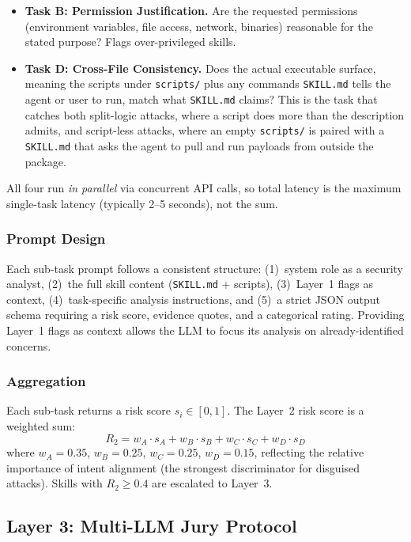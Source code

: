 \documentclass[sigconf,nonacm]{acmart}
\begin{document}
\begin{itemize}
    \item \textbf{Task B: Permission Justification.} Are the requested permissions (environment variables, file access, network, binaries) reasonable for the stated purpose? Flags over-privileged skills.

    \item \textbf{Task D: Cross-File Consistency.} Does the actual executable surface, meaning the scripts under \texttt{scripts/} plus any commands \texttt{SKILL.md} tells the agent or user to run, match what \texttt{SKILL.md} claims? This is the task that catches both split-logic attacks, where a script does more than the description admits, and script-less attacks, where an empty \texttt{scripts/} is paired with a \texttt{SKILL.md} that asks the agent to pull and run payloads from outside the package.
\end{itemize}

All four run \emph{in parallel} via concurrent API calls, so total latency is the maximum single-task latency (typically 2--5 seconds), not the sum.

\subsubsection{Prompt Design}
Each sub-task prompt follows a consistent structure: (1)~system role as a security analyst, (2)~the full skill content (\texttt{SKILL.md} + scripts), (3)~Layer~1 flags as context, (4)~task-specific analysis instructions, and (5)~a strict JSON output schema requiring a risk score, evidence quotes, and a categorical rating. Providing Layer~1 flags as context allows the LLM to focus its analysis on already-identified concerns.

\subsubsection{Aggregation}
Each sub-task returns a risk score $s_i \in [0, 1]$. The Layer~2 risk score is a weighted sum:
\begin{equation}
    R_2 = w_A \cdot s_A + w_B \cdot s_B + w_C \cdot s_C + w_D \cdot s_D
\end{equation}
where $w_A = 0.35$, $w_B = 0.25$, $w_C = 0.25$, $w_D = 0.15$, reflecting the relative importance of intent alignment (the strongest discriminator for disguised attacks). Skills with $R_2 \geq 0.4$ are escalated to Layer~3.

\subsection{Layer 3: Multi-LLM Jury Protocol}
\label{sec:layer3}
\end{document}
